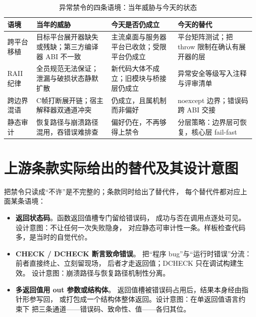 \documentclass[12pt,a4paper,fontset=fandol]{ctexbook}
\newcommand{\Lang}[1]{\textsf{#1}}
\newcommand{\CL}{\Lang{C}}
\begin{document}
\begin{table}[htbp]
\centering
\caption{异常禁令的四条语境：当年威胁与今天的状态}
\label{ch:ch11-tabctx}
\begin{tabularx}{\textwidth}{
  >{\raggedright\arraybackslash}p{}
  >{\raggedright\arraybackslash}p{}
  >{\raggedright\arraybackslash}p{}
  >{\raggedright\arraybackslash}X }
\toprule
\textbf{语境} & \textbf{当年的威胁} & \textbf{今天是否仍成立}
& \textbf{今天的替代} \\
\midrule
跨平台移植 & 目标平台展开器缺失或残缺；第三方编译器 ABI 不一致
& 主流桌面与服务器平台已收敛；受限平台仍成立
& 平台矩阵测试；把 throw 限制在确认有展开器的层 \\
RAII 纪律 & 全员规范无法保证；泄漏与破损状态静默扩散
& 新代码大体不成立；旧模块与桥接层仍成立
& 异常安全等级写入注释与评审清单 \\
跨边界混语 & \CL 帧打断展开链；宿主解释器双通道冲突
& 仍成立，且属机制而非偏好
& noexcept 边界；错误码跨 ABI 交接 \\
静态审计 & 恢复路径与崩溃路径混用，吞错误难排查
& 偏好仍在，不再够得上禁令
& 分层策略：边界层可恢复，核心层 fail-fast \\
\bottomrule
\end{tabularx}
\end{table}

\section{上游条款实际给出的替代及其设计意图}
\label{sec:ch11-alt}

把禁令只读成``不许''是不完整的；条款同时给出了替代件，
每个替代件都对应上面某条语境：

\begin{itemize}
\item \textbf{返回状态码}。函数返回值槽专门留给错误码，
成功与否在调用点逐处可见。设计意图：不让任何一次失败隐身，
对应静态可审计性一条。样板检查代码多，是当时的自觉代价。
\item \textbf{CHECK / DCHECK 断言致命错误}。
把``程序 bug''与``运行时错误''分流：前者直接终止、立刻留现场，
后者才走返回值；DCHECK 只在调试构建生效。
设计意图：崩溃路径与恢复路径机制性分离。
\item \textbf{多返回值用 out 参数或结构体}。
返回值槽被错误码占用后，结果本身经由指针形参写回，
或打包成一个结构体整体返回。设计意图：在单返回值语言约束下
把三条通道——错误码、致命性、值——各归其位。
\end{itemize}
\end{document}
